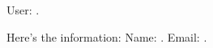 \documentclass{memoir}
\begin{document}
User: .


Here's the information: Name: \name. Email: \email.
\end{document}
